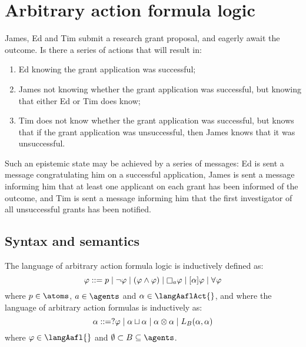 \chapter{Arbitrary action formula logic}\label{aafl}

\begin{example}\label{grant-example}
James, Ed and Tim submit a research grant proposal, and eagerly await the outcome.
Is there a series of actions that will result in: 

\begin{enumerate}
  \item Ed knowing the grant application was successful; 
  \item James not knowing whether the grant application was successful, but knowing that either Ed or Tim does know;
  \item Tim does not know whether the grant application was successful, but knows that if the grant application was unsuccessful, then James knows that it was unsuccessful.
\end{enumerate}

Such an epistemic state may be achieved by a series of messages: Ed is sent a message congratulating him on a successful application, James is sent a message informing him that at least one applicant on each grant has been informed of the outcome, and Tim is sent a message informing him that the first investigator of all unsuccessful grants has been notified.
\end{example}

\section{Syntax and semantics}\label{aafl-semantics}

\begin{definition}
The language \langAafl{} of arbitrary action formula logic is inductively defined as:
$$
    \phi ::= \atomP \mid 
           \neg \phi \mid
           (\phi \land \phi) \mid
           \necessaryA \phi \mid
           \actionA{\alpha} \phi \mid
           \allrefs \phi
$$
where $\atomP \in \atoms$, $\agentA \in \agents$ and $\alpha \in \langAaflAct{}$, and where the language \langAaflAct{} of arbitrary action formulas is inductively as:
$$
    \alpha ::= ?{\varphi} \mid
           \alpha \sqcup \alpha \mid
           \alpha \otimes \alpha \mid
           {L_{B}} (\alpha, \alpha)
$$
where $\phi \in \langAafl{}$ and $\emptyset \subset \agentsB \subseteq \agents$.
\end{definition}


